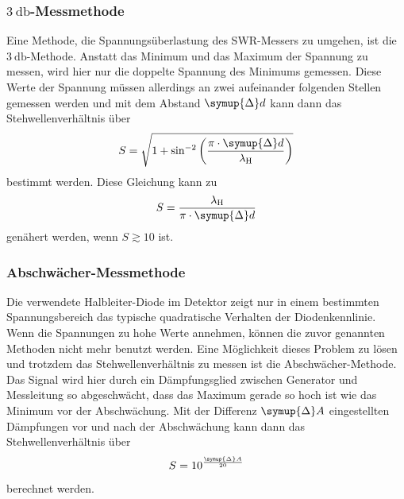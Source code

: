 \subsubsection{\texorpdfstring{$\SI{3}{\decibel}$-Messmethode}{3dB-Messmethode}}
\label{sssec:3dB_Messmethode}

Eine Methode, die Spannungsüberlastung des SWR-Messers zu umgehen, ist die $\SI{3}{\decibel}$-Methode.
Anstatt das Minimum und das Maximum der Spannung zu messen, 
wird hier nur die doppelte Spannung des Minimums gemessen.
Diese Werte der Spannung müssen allerdings an zwei aufeinander folgenden Stellen gemessen werden 
und mit dem Abstand $\symup{\Delta} d$ kann dann das Stehwellenverhältnis über
\begin{equation}
    S = \sqrt{1 + \sin^{-2}\left( \frac{\pi \cdot \symup{\Delta} d}{\lambda_\text{H}} \right)}
    \label{eq:3dB_Methode}
\end{equation}
bestimmt werden.
Diese Gleichung kann zu 
\begin{equation}
    S = \frac{\lambda_\text{H}}{\pi \cdot \symup{\Delta} d}
    \label{eq:3dB_Methode_genähert}
\end{equation}
genähert werden, wenn $S \gtrsim 10$ ist.

\subsubsection{Abschwächer-Messmethode}
\label{sssec:Abschwächer_Messmethode}

Die verwendete Halbleiter-Diode im Detektor zeigt nur in einem bestimmten Spannungsbereich das typische quadratische Verhalten der Diodenkennlinie.
Wenn die Spannungen zu hohe Werte annehmen, können die zuvor genannten Methoden nicht mehr benutzt werden.
Eine Möglichkeit dieses Problem zu lösen und trotzdem das Stehwellenverhältnis zu messen ist die Abschwächer-Methode.
Das Signal wird hier durch ein Dämpfungsglied zwischen Generator und Messleitung so abgeschwächt, dass das Maximum gerade so hoch ist wie das Minimum vor der Abschwächung.
Mit der Differenz $\symup{\Delta} A$ eingestellten Dämpfungen vor und nach der Abschwächung kann dann das Stehwellenverhältnis über
\begin{equation}
    S = 10^{\frac{\symup{\Delta} A}{20}}
    \label{eq:Abschwächer_Methode}
\end{equation}
berechnet werden.
